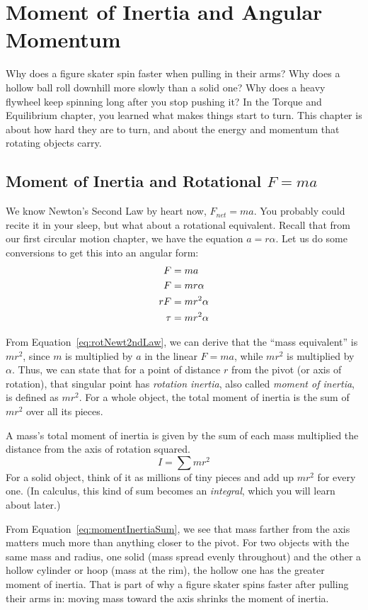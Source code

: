 \chapter{Moment of Inertia and Angular Momentum}

Why does a figure skater spin faster when pulling in their arms? Why does a hollow ball roll downhill more
slowly than a solid one? Why does a heavy flywheel keep spinning long after you stop pushing it? In the Torque
and Equilibrium chapter, you learned what makes things start to turn. This chapter is about how hard they are to
turn, and about the energy and momentum that rotating objects carry.

\section{Moment of Inertia and Rotational $F=ma$}
We know Newton's Second Law by heart now, $F_{net} = ma$. You probably could recite it in your sleep, but what about a rotational equivalent. Recall that from our first circular motion chapter, we have the equation $a = r \alpha$. Let us do some conversions to get this into an angular form:
\begin{align}
    F &= ma \notag \\
    F &= mr\alpha \notag \\
    rF &= mr^2\alpha \notag \\
    \tau &= mr^2\alpha \label{eq:rotNewt2ndLaw}
\end{align}

From Equation~\ref{eq:rotNewt2ndLaw}, we can derive that the ``mass equivalent'' is $mr^2$, since $m$ is multiplied by $a$ in the linear $F=ma$, while $mr^2$ is multiplied by $\alpha$. Thus, we can state that for a point of distance $r$ from the pivot (or axis of rotation), that singular point has \emph{rotation inertia}, also called \emph{moment of inertia}, is defined as $mr^2$. For a whole object, the total moment of inertia is the sum of $mr^2$ over all its pieces.
\begin{mdframed}[frametitle = {Moment of Inertia}, style = important]
    A mass's total moment of inertia is given by the sum of each mass multiplied the distance from the axis of rotation squared.
    \begin{equation}
        I = \sum m r^2\label{eq:momentInertiaSum}
    \end{equation}
    For a solid object, think of it as millions of tiny pieces and add up $mr^2$ for every one. (In calculus,
    this kind of sum becomes an \emph{integral}, which you will learn about later.)
\end{mdframed}
From Equation~\ref{eq:momentInertiaSum}, we see that mass farther from the axis matters much more than anything closer to the pivot. For two objects with the same mass and radius, one solid (mass spread evenly throughout) and the other a hollow cylinder or hoop (mass at the rim), the hollow one has the greater moment of inertia. That is part of why a figure skater spins faster after pulling their arms in: moving mass toward the axis shrinks the moment of inertia.

